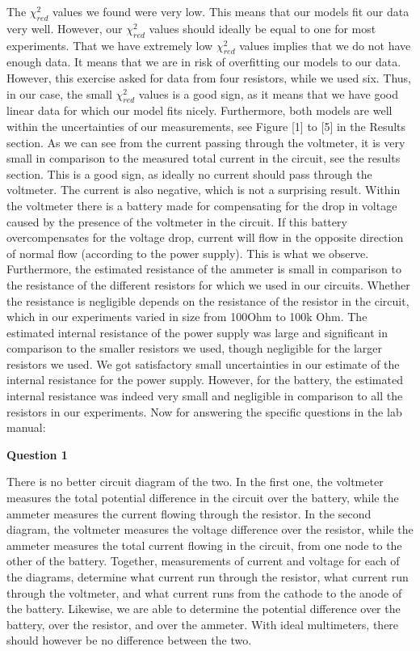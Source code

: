\documentclass[letterpaper,12pt]{article}
\begin{document}
The $\chi_{red}^2$ values we found were very low. This means that our models fit our data very well. 
However, our $\chi_{red}^2$ values should ideally be equal to one for most experiments. 
That we have extremely low $\chi_{red}^2$ values implies that we do not have enough data. 
It means that we are in risk of overfitting our models to our data. However, 
this exercise asked for data from four resistors, while we used six. 
Thus, in our case, the small $\chi_{red}^2$ values is a good sign, as it means that 
we have good linear data for which our model fits nicely. Furthermore,
 both models are well within the uncertainties of our measurements, 
 see Figure [1] to [5] in the Results section.
As we can see from the current passing through the voltmeter, 
it is very small in comparison to the measured total current in the circuit, see the results section. 
This is a good sign, as ideally no current should pass through the voltmeter. 
The current is also negative, which is not a surprising result. 
Within the voltmeter there is a battery made for compensating for the drop in voltage 
caused by the presence of the voltmeter in the circuit. If this battery overcompensates 
for the voltage drop, current will flow in the opposite direction of normal 
flow (according to the power supply). This is what we observe.
Furthermore, the estimated resistance of the ammeter is small in comparison to the 
resistance of the different resistors for which we used in our circuits. 
Whether the resistance is negligible depends on the resistance of the resistor 
in the circuit, which in our experiments varied in size from 100Ohm to 100k Ohm.
The estimated internal resistance of the power supply was large and significant 
in comparison to the smaller resistors we used, though negligible for the larger 
resistors we used. We got satisfactory small uncertainties in our estimate of the 
internal resistance for the power supply. However, for the battery, the estimated 
internal resistance was indeed very small and negligible in comparison to all the 
resistors in our experiments.
Now for answering the specific questions in the lab manual:

\textbf{Question 1}

There is no better circuit diagram of the two. In the first one, 
the voltmeter measures the total potential difference in the circuit over the battery, 
while the ammeter measures the current flowing through the resistor. 
In the second diagram, the voltmeter measures the voltage difference over the resistor, 
while the ammeter measures the total current flowing in the circuit, 
from one node to the other of the battery. Together, measurements of current 
and voltage for each of the diagrams, determine what current run through the resistor, 
what current run through the voltmeter, and what current runs from the cathode 
to the anode of the battery. Likewise, we are able to determine the potential 
difference over the battery, over the resistor, and over the ammeter. 
With ideal multimeters, there should however be no difference between the two.
\end{document}
